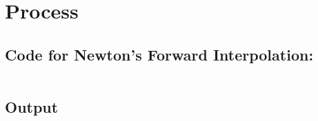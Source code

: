 \section*{Process}

\subsection*{Code for Newton's Forward Interpolation:}
\begin{verbatim}

\end{verbatim}

\subsection*{Output}
\begin{center}
    \centering
\end{center}